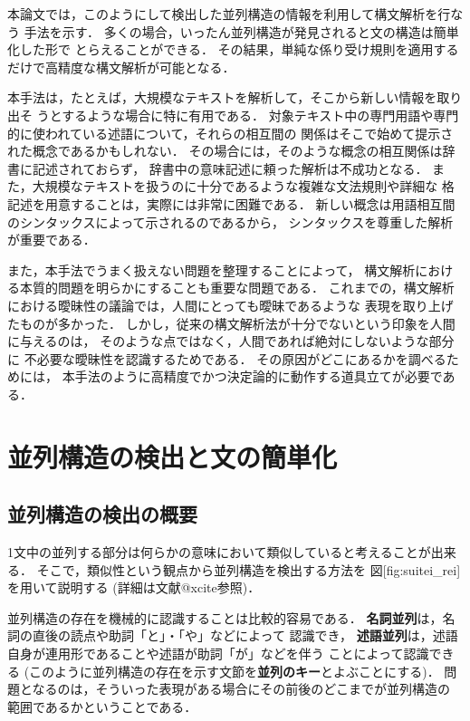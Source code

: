 本論文では，このようにして検出した並列構造の情報を利用して構文解析を行なう
手法を示す．
多くの場合，いったん並列構造が発見されると文の構造は簡単化した形で
とらえることができる．
その結果，単純な係り受け規則を適用するだけで高精度な構文解析が可能となる．

本手法は，たとえば，大規模なテキストを解析して，そこから新しい情報を取り出そ
うとするような場合に特に有用である．
対象テキスト中の専門用語や専門的に使われている述語について，それらの相互間の
関係はそこで始めて提示された概念であるかもしれない．
その場合には，そのような概念の相互関係は辞書に記述されておらず，
辞書中の意味記述に頼った解析は不成功となる．
また，大規模なテキストを扱うのに十分であるような複雑な文法規則や詳細な
格記述を用意することは，実際には非常に困難である．
新しい概念は用語相互間のシンタックスによって示されるのであるから，
シンタックスを尊重した解析が重要である．

また，本手法でうまく扱えない問題を整理することによって，
構文解析における本質的問題を明らかにすることも重要な問題である．
これまでの，構文解析における曖昧性の議論では，人間にとっても曖昧であるような
表現を取り上げたものが多かった．
しかし，従来の構文解析法が十分でないという印象を人間に与えるのは，
そのような点ではなく，人間であれば絶対にしないような部分に
不必要な曖昧性を認識するためである．
その原因がどこにあるかを調べるためには，
本手法のように高精度でかつ決定論的に動作する道具立てが必要である．

{\unitlength=1mm
}

\section{並列構造の検出と文の簡単化}

\subsection{並列構造の検出の概要} 

1文中の並列する部分は何らかの意味において類似していると考えることが出来る．
そこで，類似性という観点から並列構造を検出する方法を
図[fig:suitei_rei]を用いて説明する
(詳細は文献@xcite参照)．

並列構造の存在を機械的に認識することは比較的容易である．
{\bf 名詞並列}は，名詞の直後の読点や助詞「と」・「や」などによって
認識でき，
{\bf 述語並列}は，述語自身が連用形であることや述語が助詞「が」などを伴う
ことによって認識できる
(このように並列構造の存在を示す文節を{\bf 並列のキー}とよぶことにする)．
問題となるのは，そういった表現がある場合にその前後のどこまでが並列構造の
範囲であるかということである．

